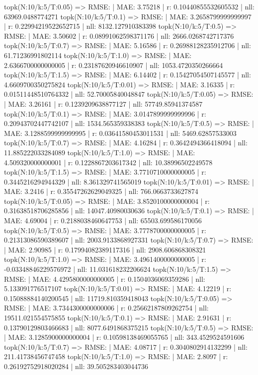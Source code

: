 topk(N:10/k:5/T:0.05) => RMSE: | MAE: 3.75218 | r: 0.10440855532605532 | nll: 63969.0488774271
topk(N:10/k:5/T:0.1) => RMSE: | MAE: 3.2658799999999997 | r: 0.22994219522652715 | nll: 8132.127910383398
topk(N:10/k:5/T:0.5) => RMSE: | MAE: 3.50602 | r: 0.08991062598371176 | nll: 2666.0268742717376
topk(N:10/k:5/T:0.7) => RMSE: | MAE: 5.16586 | r: 0.26988128235912706 | nll: 61.71236991802114
topk(N:10/k:5/T:1.0) => RMSE: | MAE: 2.6366700000000005 | r: 0.23187620946610907 | nll: 1053.4720350266664
topk(N:10/k:5/T:1.5) => RMSE: | MAE: 6.14402 | r: 0.15427054507145577 | nll: 4.6609700350275824
topk(N:10/k:5/T:0.01) => RMSE: | MAE: 3.16335 | r: 0.01511448510764332 | nll: 52.70005840048847
topk(N:10/k:5/T:0.05) => RMSE: | MAE: 3.26161 | r: 0.1239209638877127 | nll: 57749.85941374587
topk(N:10/k:5/T:0.1) => RMSE: | MAE: 3.0147899999999996 | r: 0.20943702447742107 | nll: 1534.565359338383
topk(N:10/k:5/T:0.5) => RMSE: | MAE: 3.1288599999999995 | r: 0.03641580453011531 | nll: 5469.62857533003
topk(N:10/k:5/T:0.7) => RMSE: | MAE: 4.16284 | r: 0.3642494366418094 | nll: 11.885222033284089
topk(N:10/k:5/T:1.0) => RMSE: | MAE: 4.509320000000001 | r: 0.1228867203617342 | nll: 10.38996502249578
topk(N:10/k:5/T:1.5) => RMSE: | MAE: 3.7710710000000005 | r: 0.3445216294944329 | nll: 8.361329741565019
topk(N:10/k:5/T:0.01) => RMSE: | MAE: 3.2416 | r: 0.35547262629049325 | nll: 766.0663733627874
topk(N:10/k:5/T:0.05) => RMSE: | MAE: 3.8520100000000004 | r: 0.31638518706285856 | nll: 14047.40980030636
topk(N:10/k:5/T:0.1) => RMSE: | MAE: 4.69004 | r: 0.2188038460647753 | nll: 65503.699586170056
topk(N:10/k:5/T:0.5) => RMSE: | MAE: 3.7778700000000005 | r: 0.21313086590389607 | nll: 2003.9133868927331
topk(N:10/k:5/T:0.7) => RMSE: | MAE: 2.90985 | r: 0.17994082389117316 | nll: 2908.606868308321
topk(N:10/k:5/T:1.0) => RMSE: | MAE: 3.4961400000000005 | r: -0.03348846229576972 | nll: 11.031618232206624
topk(N:10/k:5/T:1.5) => RMSE: | MAE: 4.4295800000000005 | r: 0.1504036069359286 | nll: 5.133091776517107
topk(N:10/k:5/T:0.01) => RMSE: | MAE: 4.12219 | r: 0.15088884140200545 | nll: 11719.810359418043
topk(N:10/k:5/T:0.05) => RMSE: | MAE: 3.7344300000000006 | r: 0.25662187809262754 | nll: 19511.021554575855
topk(N:10/k:5/T:0.1) => RMSE: | MAE: 2.91631 | r: 0.13790129803466683 | nll: 8077.6491868375215
topk(N:10/k:5/T:0.5) => RMSE: | MAE: 3.1285900000000004 | r: 0.10598138469055765 | nll: 343.4529524591606
topk(N:10/k:5/T:0.7) => RMSE: | MAE: 4.08717 | r: 0.3040802914132299 | nll: 211.41738456747458
topk(N:10/k:5/T:1.0) => RMSE: | MAE: 2.8097 | r: 0.26192752918020284 | nll: 39.505283403044736
